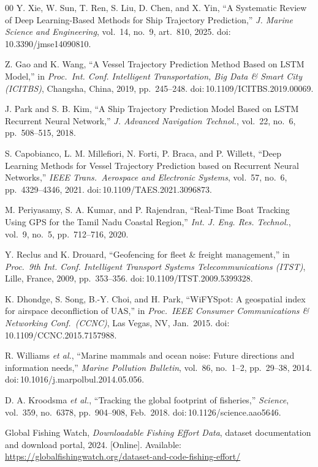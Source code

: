 \documentclass[conference]{IEEEtran}
\begin{document}
\begin{thebibliography}{00}
 Y. Xie, W. Sun, T. Ren, S. Liu, D. Chen, and X. Yin, ``A Systematic Review of Deep Learning-Based Methods for Ship Trajectory Prediction,'' \emph{J. Marine Science and Engineering}, vol.~14, no.~9, art.\ 810, 2025. doi:\,10.3390/jmse14090810.

 Z. Gao and K. Wang, ``A Vessel Trajectory Prediction Method Based on LSTM Model,'' in \emph{Proc.\ Int. Conf. Intelligent Transportation, Big Data \& Smart City (ICITBS)}, Changsha, China, 2019, pp.~245--248. doi:\,10.1109/ICITBS.2019.00069.

 J. Park and S. B. Kim, ``A Ship Trajectory Prediction Model Based on LSTM Recurrent Neural Network,'' \emph{J. Advanced Navigation Technol.}, vol.~22, no.~6, pp.~508--515, 2018.

 S. Capobianco, L. M. Millefiori, N. Forti, P. Braca, and P. Willett, ``Deep Learning Methods for Vessel Trajectory Prediction based on Recurrent Neural Networks,'' \emph{IEEE Trans.\ Aerospace and Electronic Systems}, vol.~57, no.~6, pp.~4329--4346, 2021. doi:\,10.1109/TAES.2021.3096873.

 M. Periyasamy, S. A. Kumar, and P. Rajendran, ``Real-Time Boat Tracking Using GPS for the Tamil Nadu Coastal Region,'' \emph{Int. J. Eng. Res. Technol.}, vol.~9, no.~5, pp.~712--716, 2020.

 Y. Reclus and K. Drouard, ``Geofencing for fleet \& freight management,'' in \emph{Proc.\ 9th Int. Conf. Intelligent Transport Systems Telecommunications (ITST)}, Lille, France, 2009, pp.~353--356. doi:\,10.1109/ITST.2009.5399328.

 K. Dhondge, S. Song, B.-Y. Choi, and H. Park, ``WiFYSpot: A geospatial index for airspace deconfliction of UAS,'' in \emph{Proc.\ IEEE Consumer Communications \& Networking Conf.\ (CCNC)}, Las Vegas, NV, Jan.\ 2015. doi:\,10.1109/CCNC.2015.7157988.

 R. Williams \emph{et al.}, ``Marine mammals and ocean noise: Future directions and information needs,'' \emph{Marine Pollution Bulletin}, vol.~86, no.~1--2, pp.~29--38, 2014. doi:\,10.1016/j.marpolbul.2014.05.056.

 D. A. Kroodsma \emph{et al.}, ``Tracking the global footprint of fisheries,'' \emph{Science}, vol.~359, no.~6378, pp.~904--908, Feb.\ 2018. doi:\,10.1126/science.aao5646.

 Global Fishing Watch, \emph{Downloadable Fishing Effort Data}, dataset documentation and download portal, 2024. [Online]. Available: \url{https://globalfishingwatch.org/dataset-and-code-fishing-effort/}

\end{thebibliography}
\end{document}
